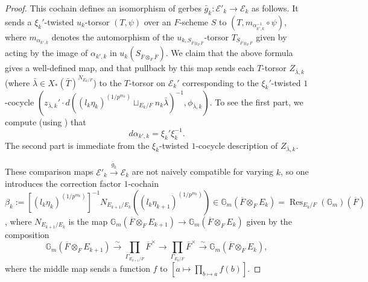 \documentclass{amsart}
\theoremstyle{definition}
\theoremstyle{remark}
\DeclareMathOperator\Res{Res}
\newcommand{\ov}{\overline}
\begin{document}
\begin{proof}
This cochain defines an isomorphism of gerbes $\bar{g}_{k} \colon \mathcal{E}'_{k} \to \mathcal{E}_{k}$ as follows. It sends a $\xi_{k}'$-twisted $u_{k}$-torsor $(T,\psi)$ over an $F$-scheme $S$ to $(T,m_{\alpha_{k',k}^{-1}} \circ \psi)$, where $m_{\alpha_{k',k}}$ denotes the automorphism of the $u_{k,S_{\ov{F} \otimes_{F} \ov{F}}}$-torsor $T_{S_{\ov{F} \otimes_{F} \ov{F}}}$ given by acting by the image of $\alpha_{k',k}$ in $u_{k}(S_{\ov{F} \otimes_{F} \ov{F}})$. We claim that the above formula gives a well-defined map, and that pullback by this map sends each $T$-torsor $Z_{\bar{\lambda},k}$ (where $\bar{\lambda} \in X_{*}(\bar{T})^{N_{E_{k}/F}}$) to the $T$-torsor on $\mathcal{E}_{k}'$ corresponding to the $\xi_{k}'$-twisted $1$-cocycle $(z_{\bar{\lambda},k}' \cdot d((l_{k}\eta_{k})^{(1/p^{m_{k}})} \sqcup_{E_{k}/F} n_{k}\bar{\lambda})^{-1}, \phi_{\bar{\lambda},k})$. To see the first part, we compute (using \cite[Proposition 4.4]{Dillery1}) that
\begin{equation*}
    d\alpha_{k',k} = \xi_{k}'\xi_{k}^{-1}.
\end{equation*}
The second part is immediate from the $\xi_{k}$-twisted $1$-cocycle description of $Z_{\bar{\lambda},k}$.

These comparison maps $\mathcal{E}'_{k} \xrightarrow{\bar{g}_{k}} \mathcal{E}_{k}$ are not naively compatible for varying $k$, so one introduces the correction factor $1$-cochain $\beta_{k}:=[(l_{k}\eta_{k})^{(1/p^{m_{k}})}]^{-1}N_{E_{k+1}/E_{k}}((l_{k}\eta_{k+1})^{(1/p^{m_{k}})}) \in \mathbb{G}_{m}(\ov{F} \otimes_{F} E_{k}) = \Res_{E_{k}/F}(\mathbb{G}_{m})(\ov{F})$, where $N_{E_{k+1}/E_{k}}$ is the map $\mathbb{G}_{m}(\ov{F} \otimes_{F} E_{k+1}) \to \mathbb{G}_{m}(\ov{F} \otimes_{F} E_{k})$ given by the composition
\begin{equation*}
  \mathbb{G}_{m}(\ov{F} \otimes_{F} E_{k+1}) \xrightarrow{\sim}  \prod_{\Gamma_{E_{k+1}/F}} \ov{F}^{\times} \to \prod_{\Gamma_{E_{k}/F}} \ov{F}^{\times} \xrightarrow{\sim} \mathbb{G}_{m}(\ov{F} \otimes_{F} E_{k}),
\end{equation*}
where the middle map sends a function $f$ to $[a \mapsto \prod_{b \mapsto a} f(b)]$.


\end{proof}
\end{document}
